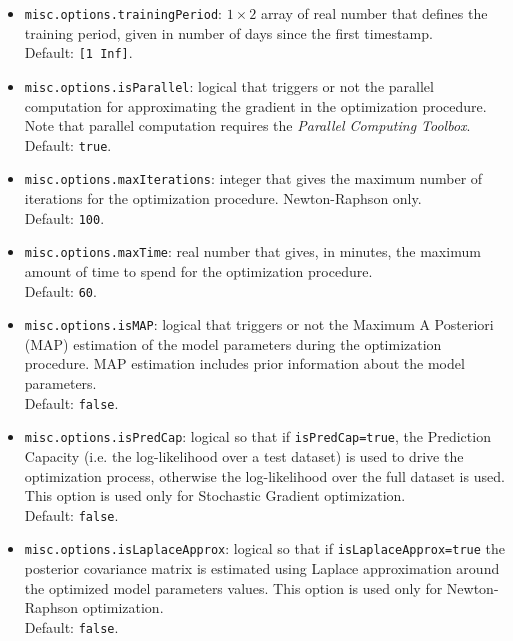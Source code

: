 \begin{itemize}
\begin{itemize}
\item \lstinline[basicstyle = \mlttfamily \small ]!misc.options.trainingPeriod!:  $1\times2$ array of real number that defines the training period, given in number of days since the first timestamp. \\Default: \lstinline[basicstyle = \mlttfamily \small ]![1 Inf]!. 
\item \lstinline[basicstyle = \mlttfamily \small ]!misc.options.isParallel!: logical that triggers or not the parallel computation for approximating the gradient in the optimization procedure. Note that parallel computation requires the \MATLAB{} \emph{Parallel Computing Toolbox}. \\Default: \lstinline[basicstyle = \mlttfamily \small ]!true!.
\item \lstinline[basicstyle = \mlttfamily \small ]!misc.options.maxIterations!: integer that gives the maximum number of iterations for the optimization procedure. Newton-Raphson only. \\Default: \lstinline[basicstyle = \mlttfamily \small ]!100!.
\item \lstinline[basicstyle = \mlttfamily \small ]!misc.options.maxTime!: real number that gives, in minutes, the maximum amount of  time to spend for the optimization procedure. \\Default: \lstinline[basicstyle = \mlttfamily \small ]!60!.
\item \lstinline[basicstyle = \mlttfamily \small ]!misc.options.isMAP!: logical that triggers or not the Maximum A Posteriori (MAP) estimation of the model parameters during the optimization procedure. MAP estimation includes prior information about the model parameters. \\Default: \lstinline[basicstyle = \mlttfamily \small ]!false!.
\item \lstinline[basicstyle = \mlttfamily \small ]!misc.options.isPredCap!: logical so that if \lstinline[basicstyle = \mlttfamily \small ]!isPredCap=true!, the Prediction Capacity (i.e. the log-likelihood over a test dataset) is used to drive the optimization process, otherwise the log-likelihood over the full dataset is used. This option is used only for Stochastic Gradient optimization. \\Default: \lstinline[basicstyle = \mlttfamily \small ]!false!.
\item \lstinline[basicstyle = \mlttfamily \small ]!misc.options.isLaplaceApprox!: logical so that if \lstinline[basicstyle = \mlttfamily \small ]!isLaplaceApprox=true! the posterior covariance matrix is estimated using Laplace approximation around the optimized model parameters values. This option is used only for Newton-Raphson optimization. \\Default: \lstinline[basicstyle = \mlttfamily \small ]!false!.

\end{itemize}
\end{itemize}
